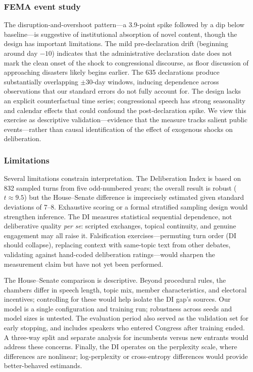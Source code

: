 \documentclass[12pt]{article}
\begin{document}
\subsubsection*{FEMA event study} The disruption-and-overshoot pattern---a 3.9-point spike followed by a dip below baseline---is suggestive of institutional absorption of novel content, though the design has important limitations. The mild pre-declaration drift (beginning around day $-10$) indicates that the administrative declaration date does not mark the clean onset of the shock to congressional discourse, as floor discussion of approaching disasters likely begins earlier. The 635 declarations produce substantially overlapping $\pm30$-day windows, inducing dependence across observations that our standard errors do not fully account for. The design lacks an explicit counterfactual time series; congressional speech has strong seasonality and calendar effects that could confound the post-declaration spike. We view this exercise as descriptive validation---evidence that the measure tracks salient public events---rather than causal identification of the effect of exogenous shocks on deliberation.

\subsubsection*{Limitations} Several limitations constrain interpretation. The Deliberation Index is based on 832 sampled turns from five odd-numbered years; the overall result is robust ($t \approx 9.5$) but the House--Senate difference is imprecisely estimated given standard deviations of 7--8. Exhaustive scoring or a formal stratified sampling design would strengthen inference. The DI measures statistical sequential dependence, not deliberative quality \textit{per se}: scripted exchanges, topical continuity, and genuine engagement may all raise it. Falsification exercises---permuting turn order (DI should collapse), replacing context with same-topic text from other debates, validating against hand-coded deliberation ratings---would sharpen the measurement claim but have not yet been performed.

The House--Senate comparison is descriptive. Beyond procedural rules, the chambers differ in speech length, topic mix, member characteristics, and electoral incentives; controlling for these would help isolate the DI gap's sources. Our model is a single configuration and training run; robustness across seeds and model sizes is untested. The evaluation period also served as the validation set for early stopping, and includes speakers who entered Congress after training ended. A three-way split and separate analysis for incumbents versus new entrants would address these concerns. Finally, the DI operates on the perplexity scale, where differences are nonlinear; log-perplexity or cross-entropy differences would provide better-behaved estimands.
\end{document}
